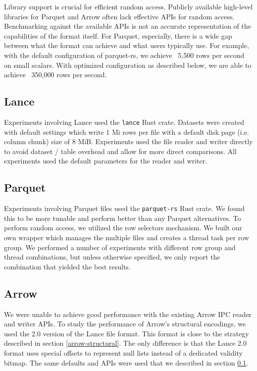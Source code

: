 \documentclass[sigconf, nonacm]{acmart}
\begin{document}
Library support is crucial for efficient random access.  Publicly available high-level libraries for Parquet and Arrow often lack effective APIs for random access.  Benchmarking against the available APIs is not an accurate representation of the capabilities of the format itself.  For Parquet, especially, there is a wide gap between what the format can achieve and what users typically use.  For example, with the default configuration of parquet-rs, we achieve ~5,500 rows per second on small scalars.  With optimized configuration as described below, we are able to achieve ~350,000 rows per second.

\subsection{Lance} \label{lance-methods}

Experiments involving Lance used the \texttt{lance} Rust crate.  Datasets were created with default settings which write 1 Mi rows per file with a default disk page (i.e. column chunk) size of 8 MiB.  Experiments used the file reader and writer directly to avoid dataset / table overhead and allow for more direct comparisons.  All experiments used the default parameters for the reader and writer.

\subsection{Parquet}

Experiments involving Parquet files used the \texttt{parquet-rs} Rust crate.  We found this to be more tunable and perform better than any Parquet alternatives.  To perform random access, we utilized the row selectors mechanism.   We built our own wrapper which manages the multiple files and creates a thread task per row group.  We performed a number of experiments with different row group and thread combinations, but unless otherwise specified, we only report the combination that yielded the best results.

\subsection{Arrow}

We were unable to achieve good performance with the existing Arrow IPC reader and writer APIs.  To study the performance of Arrow's structural encodings, we used the 2.0 version of the Lance file format.  This format is close to the strategy described in section \ref{arrow-structural}.  The only difference is that the Lance 2.0 format uses special offsets to represent null lists instead of a dedicated validity bitmap.  The same defaults and APIs were used that we described in section \ref{lance-methods}.
\end{document}
